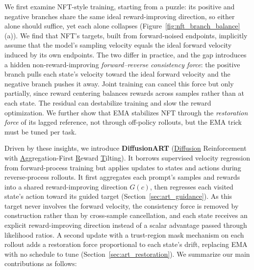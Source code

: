 \documentclass{article}
\begin{document}
We first examine NFT-style training, starting from a puzzle: its positive and negative branches share the same ideal reward-improving direction, so either alone should suffice, yet each alone collapses (Figure~\ref{fig:nft_branch_balance}(a)). We find that NFT's targets, built from forward-noised endpoints, implicitly assume that the model's sampling velocity equals the ideal forward velocity induced by its own endpoints. The two differ in practice, and the gap introduces a hidden non-reward-improving \emph{forward--reverse consistency force}: the positive branch pulls each state's velocity toward the ideal forward velocity and the negative branch pushes it away. Joint training can cancel this force but only partially, since reward centering balances rewards across samples rather than at each state. The residual can destabilize training and slow the reward optimization. We further show that EMA stabilizes NFT through the \emph{restoration force} of its lagged reference, not through off-policy rollouts, but the EMA trick must be tuned per task.

Driven by these insights, we introduce \textbf{DiffusionART} (\underline{Diffusion} Reinforcement with \underline{A}ggregation-First \underline{R}eward \underline{T}ilting). It borrows supervised velocity regression from forward-process training but applies updates to states and actions during reverse-process rollouts. It first aggregates each prompt's samples and rewards into a shared reward-improving direction $G(c)$, then regresses each visited state's action toward its guided target (Section~\ref{sec:art_guidance}). As this target never involves the forward velocity, the consistency force is removed by construction rather than by cross-sample cancellation, and each state receives an explicit reward-improving direction instead of a scalar advantage passed through likelihood ratios. A second update with a trust-region mask mechanism on each rollout adds a restoration force proportional to each state's drift, replacing EMA with no schedule to tune (Section~\ref{sec:art_restoration}). We summarize our main contributions as follows:
\end{document}
